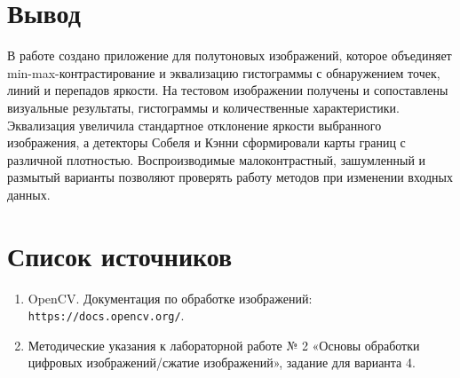 \documentclass[12pt,a4paper]{article}
\begin{document}
\section{Вывод}

В работе создано приложение для полутоновых изображений, которое объединяет
min-max-контрастирование и эквализацию гистограммы с обнаружением точек,
линий и перепадов яркости. На тестовом изображении получены и сопоставлены
визуальные результаты, гистограммы и количественные характеристики.
Эквализация увеличила стандартное отклонение яркости выбранного изображения,
а детекторы Собеля и Кэнни сформировали карты границ с различной плотностью.
Воспроизводимые малоконтрастный, зашумленный и размытый варианты позволяют
проверять работу методов при изменении входных данных.

\section*{Список источников}
\begin{enumerate}
    \item OpenCV. Документация по обработке изображений:
    \texttt{https://docs.opencv.org/}.
    \item Методические указания к лабораторной работе № 2
    «Основы обработки цифровых изображений/сжатие изображений»,
    задание для варианта 4.
\end{enumerate}
\end{document}
